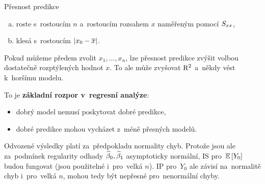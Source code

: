 \begin{remark}
	Přesnost predikce \begin{enumerate}[a)]
		\item roste s~rostoucím $n$ a~rostoucím rozsahem $x$ naměřeným pomocí $S_{xx}$,
		\item klesá s~rostoucím $|x_0-\overline{x}|$.
	\end{enumerate}
Pokud můžeme předem zvolit $x_1,..., x_n$, lze přesnost predikce zvýšit volbou dostatečně rozptýlených hodnot $x$. To ale může zvyšovat $\mathrm{R}^2$ a~někdy vést k~horšímu modelu.

To je \textbf{základní rozpor v~regresní analýze}:
\begin{itemize}
	\item dobrý model nemusí poskytovat dobré predikce,
	\item dobré predikce mohou vycházet z~méně přesných modelů.
\end{itemize}
\end{remark}
\begin{remark}
	Odvozené výsledky platí za~předpokladu normality chyb. Protože jsou ale za~podmínek regularity odhady $\widehat{\beta}_0,\widehat{\beta}_1$ asymptoticky normální, IS pro~$\mathbb{E}\left[ Y_0 \right]$ budou fungovat (jsou použitelné i~pro~velká $n$). IP pro~$Y_0$ ale závisí na~normalitě  chyb i~pro~velká $n$, mohou tedy být nepřesné pro~nenormální chyby.
\end{remark}
